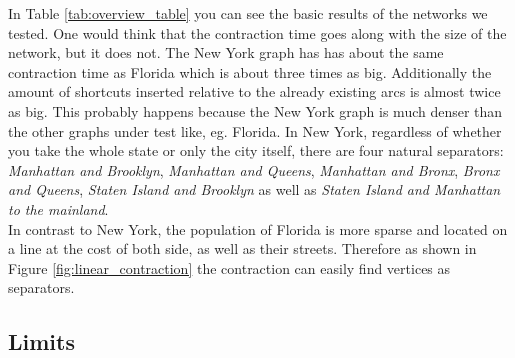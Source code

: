 In Table \ref{tab:overview_table} you can see the basic results of the networks we tested.
One would think that the contraction time goes along with the size of the network, but it does not.
The New York graph has has about the same contraction time as Florida which is about three times as big.
Additionally the amount of shortcuts inserted relative to the already existing arcs is almost twice as big.
This probably happens because the New York graph is much denser than the other graphs under test like, eg. Florida.
In New York, regardless of whether you take the whole state or only the city itself, there are four natural separators: \textit{Manhattan and Brooklyn}, \textit{Manhattan and Queens}, \textit{Manhattan and Bronx}, \textit{Bronx and Queens}, \textit{Staten Island and Brooklyn} as well as \textit{Staten Island and Manhattan to the mainland}.
\\ 
In contrast to New York, the population of Florida is more sparse and located on a line at the cost of both side, as well as their streets.
Therefore as shown in Figure \ref{fig:linear_contraction} the contraction can easily find vertices as separators.

\subsection{Limits} \label{sec:contraction_limits}

